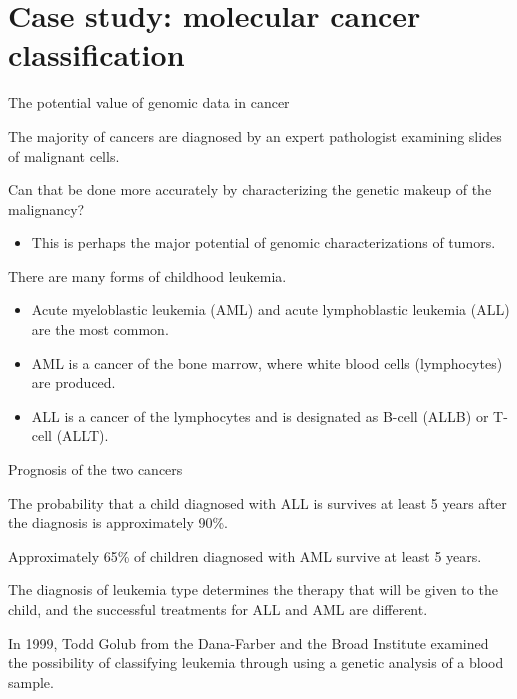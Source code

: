 \documentclass[
  ignorenonframetext,
]{beamer}
\providecommand{\tightlist}{%
  \setlength{\itemsep}{0pt}\setlength{\parskip}{0pt}}
\begin{document}
\hypertarget{case-study-molecular-cancer-classification}{%
\section{Case study: molecular cancer
classification}\label{case-study-molecular-cancer-classification}}

\begin{frame}{The potential value of genomic data in cancer}
\protect\hypertarget{the-potential-value-of-genomic-data-in-cancer}{}

The majority of cancers are diagnosed by an expert pathologist examining
slides of malignant cells.

Can that be done more accurately by characterizing the genetic makeup of
the malignancy?

\begin{itemize}
\tightlist
\item
  This is perhaps the major potential of genomic characterizations of
  tumors.
\end{itemize}

There are many forms of childhood leukemia.

\begin{itemize}
\item
  Acute myeloblastic leukemia (AML) and acute lymphoblastic leukemia
  (ALL) are the most common.
\item
  AML is a cancer of the bone marrow, where white blood cells
  (lymphocytes) are produced.
\item
  ALL is a cancer of the lymphocytes and is designated as B-cell (ALLB)
  or T-cell (ALLT).
\end{itemize}

\end{frame}

\begin{frame}{Prognosis of the two cancers}
\protect\hypertarget{prognosis-of-the-two-cancers}{}

The probability that a child diagnosed with ALL is survives at least 5
years after the diagnosis is approximately 90\%.

Approximately 65\% of children diagnosed with AML survive at least 5
years.

The diagnosis of leukemia type determines the therapy that will be given
to the child, and the successful treatments for ALL and AML are
different.

In 1999, Todd Golub from the Dana-Farber and the Broad Institute
examined the possibility of classifying leukemia through using a genetic
analysis of a blood sample.

\end{frame}
\end{document}
